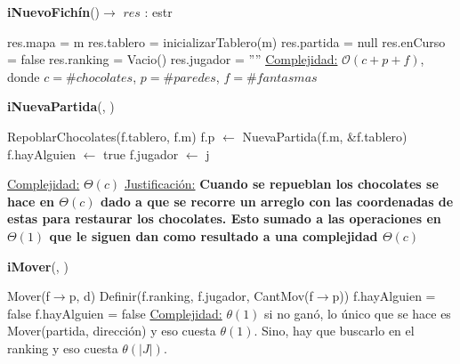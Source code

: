 \documentclass[10pt,a4paper]{article}
\begin{document}
\begin{Algoritmos}

    \begin{algorithm}[H]{\textbf{iNuevoFichín}()$\to$ $res$ : estr}
        \begin{algorithmic}
            \State res.mapa = m
            \State res.tablero = inicializarTablero(m) 
            \State res.partida = null
            \State res.enCurso = false
            \State res.ranking = Vacio()
            \State res.jugador = ''''
            \Statex \underline{Complejidad:} $\mathcal{O}(c + p + f)$, donde $c = \#chocolates$, $p = \#paredes$, $f = \#fantasmas$
        \end{algorithmic}
    \end{algorithm}

    \begin{algorithm}[H]{\textbf{iNuevaPartida}(, )}
        \begin{algorithmic}
        
            \State RepoblarChocolates(f.tablero, f.m)
            \State f.p $\leftarrow$ NuevaPartida(f.m, &f.tablero)
            \State f.hayAlguien $\leftarrow$ true
            \State f.jugador $\leftarrow$ j
        
            \Statex \underline{Complejidad:} $\Theta(c)$
            \Statex \underline{Justificación:} \textbf{Cuando se repueblan los chocolates se hace en $\Theta(c)$ dado a que se recorre un arreglo con las coordenadas de estas para restaurar los chocolates.
		Esto sumado a las operaciones en $\Theta(1)$ que le siguen dan como resultado a una complejidad $\Theta(c)$}
        \end{algorithmic}
    \end{algorithm}

    \begin{algorithm}[H]{\textbf{iMover}(, })
        \begin{algorithmic}
            \State Mover(f$\to$p, d)
                \State Definir(f.ranking, f.jugador, CantMov(f$\to$p))
                \State f.hayAlguien = false
            \Else
                    \State f.hayAlguien = false
                \EndIf
            \EndIf
            \State \underline{Complejidad:} $\theta(1)$ si no ganó, lo único que se hace es Mover(partida, dirección) y eso cuesta $\theta(1)$. Sino, hay que buscarlo en el ranking y eso cuesta $\theta(|J|)$.
        \end{algorithmic}
        

\end{algorithm}
\end{Algoritmos}
\end{document}

